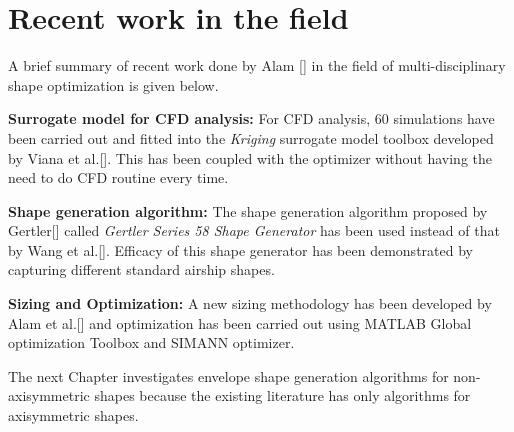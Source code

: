 \section{Recent work in the field}

A brief summary of recent work done by Alam [] in the field of multi-disciplinary shape optimization is given below. 

\textbf{Surrogate model for CFD analysis:}
For CFD analysis, 60 simulations have been carried out and fitted into the \textit{Kriging} surrogate model toolbox developed by Viana et al.[]. This has been coupled with the optimizer without having the need to do CFD routine every time.

\textbf{Shape generation algorithm:}
The shape generation algorithm proposed by Gertler[] called \textit{Gertler Series 58 Shape Generator} has been used instead of that by Wang et al.[]. Efficacy of this shape generator has been demonstrated by capturing different standard airship shapes. 

\textbf{Sizing and Optimization:} 
A new sizing methodology has been developed by Alam et al.[] and optimization has been carried out using MATLAB Global optimization Toolbox and SIMANN optimizer.

The next Chapter investigates envelope shape generation algorithms for non-axisymmetric shapes because the existing literature has only algorithms for axisymmetric shapes. 





